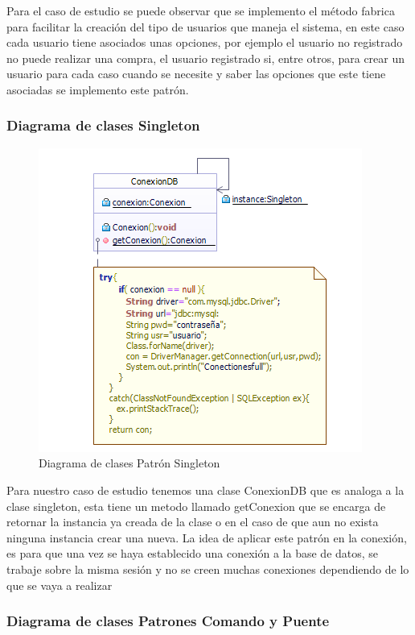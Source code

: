 Para el caso de estudio se puede observar que se implemento el método fabrica para facilitar la creación del tipo de usuarios que maneja el sistema, en este caso cada usuario tiene asociados unas opciones, por ejemplo el usuario no registrado no puede realizar una compra, el usuario registrado si, entre otros, para crear un usuario para cada caso cuando se necesite y saber las opciones que este tiene asociadas se implemento este patrón.

\subsubsection*{Diagrama de clases Singleton}
\begin{figure}[h!]
	\centering
	\includegraphics[width=0.6\linewidth]{arquitectura/imagenes/PatronSingeltonCasoEstudio}
	\caption{Diagrama de clases Patrón Singleton}
\end{figure}

Para nuestro caso de estudio tenemos una clase ConexionDB que es analoga a la clase singleton, esta tiene un metodo llamado getConexion que se encarga de retornar la instancia ya creada de la clase o en el caso de que aun no exista ninguna instancia crear una nueva.\newline
La idea de  aplicar este patrón en la conexión, es para que una vez se haya establecido una conexión a la base de datos, se trabaje sobre la misma sesión y no se creen muchas conexiones dependiendo de lo que se vaya a realizar  

\subsubsection*{Diagrama de clases Patrones Comando y Puente}

